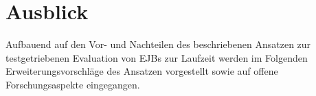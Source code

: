 \chapter{Ausblick}
Aufbauend auf den Vor- und Nachteilen des beschriebenen Ansatzen zur testgetriebenen Evaluation von EJBs zur Laufzeit werden im Folgenden Erweiterungsvorschläge des Ansatzen vorgestellt sowie auf offene Forschungsaspekte eingegangen.
 